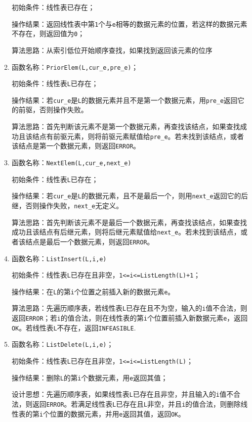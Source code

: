 \documentclass[supercite]{Experimental_Report}
\theoremstyle{definition}
\begin{document}
\begin{enumerate}
初始条件：线性表已存在；

操作结果：返回线性表中第\verb|1|个与\verb|e|相等的数据元素的位置，若这样的数据元素不存在，则返回值为\verb|0|；

算法思路：从索引低位开始顺序查找，如果找到返回该元素的位序

\item 函数名称：\verb|PriorElem(L,cur_e,pre_e)|；

初始条件：线性表\verb|L|已存在；

操作结果：若\verb|cur_e|是\verb|L|的数据元素并且不是第一个数据元素，用\verb|pre_e|返回它的前驱，否则操作失败。

算法思路：首先判断该元素不是第一个数据元素，再查找该结点，如果查找成功且该结点有前驱元素，则将前驱元素赋值给\verb|pre_e|。若未找到该结点，或者该结点是第一个数据元素，则返回\verb|ERROR|。

\item 函数名称：\verb|NextElem(L,cur_e,next_e)|

初始条件：线性表\verb|L|已存在；

操作结果：若\verb|cur_e|是\verb|L|的数据元素，且不是最后一个，则用\verb|next_e|返回它的后继，否则操作失败，\verb|next_e|无定义。

算法思路：首先判断该元素不是最后一个数据元素，再查找该结点，如果查找成功且该结点有后继元素，则将后继元素赋值给\verb|next_e|。若未找到该结点，或者该结点是最后一个数据元素，则返回\verb|ERROR|。

\item 函数名称：\verb|ListInsert(L,i,e)|

初始条件：线性表\verb|L|已存在且非空，\verb|1<=i<=ListLength(L)+1|；

操作结果：在\verb|L|的第\verb|i|个位置之前插入新的数据元素\verb|e|。

算法思路：先遍历顺序表，若线性表\verb|L|已存在且不为空，输入的\verb|i|值不合法，则返回\verb|ERROR|；若\verb|i|的值合法，则在线性表的第\verb|i|个位置前插入新数据元素\verb|e|，返回\verb|OK|。若线性表\verb|L|不存在，返回\verb|INFEASIBLE|.

\item 函数名称：\verb|ListDelete(L,i,e)|；

初始条件：线性表\verb|L|已存在且非空，\verb|1<=i<=ListLength(L)|；

操作结果：删除\verb|L|的第\verb|i|个数据元素，用\verb|e|返回其值；

设计思想：先遍历顺序表，如果线性表\verb|L|已存在且非空，并且输入的\verb|i|值不合法，则返回\verb|ERROR|。若满足线性表\verb|L|已存在且\verb|L|非空，并且\verb|i|的值合法，则删除线性表的第\verb|i|个位置的数据元素，并用\verb|e|返回其值，返回\verb|OK|。


\end{enumerate}
\end{document}
